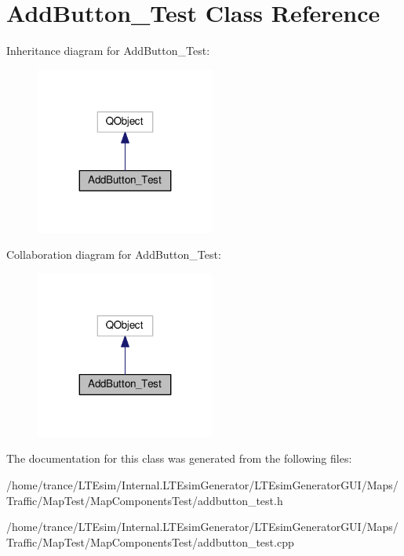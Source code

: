 \hypertarget{class_add_button___test}{}\section{Add\+Button\+\_\+\+Test Class Reference}
\label{class_add_button___test}


Inheritance diagram for Add\+Button\+\_\+\+Test\+:
\nopagebreak
\begin{figure}[H]
\begin{center}
\leavevmode
\includegraphics[width=167pt]{class_add_button___test__inherit__graph}
\end{center}
\end{figure}


Collaboration diagram for Add\+Button\+\_\+\+Test\+:
\nopagebreak
\begin{figure}[H]
\begin{center}
\leavevmode
\includegraphics[width=167pt]{class_add_button___test__coll__graph}
\end{center}
\end{figure}


The documentation for this class was generated from the following files\+:\begin{DoxyCompactItemize}
\item 
/home/trance/\+L\+T\+Esim/\+Internal.\+L\+T\+Esim\+Generator/\+L\+T\+Esim\+Generator\+G\+U\+I/\+Maps/\+Traffic/\+Map\+Test/\+Map\+Components\+Test/addbutton\+\_\+test.\+h\item 
/home/trance/\+L\+T\+Esim/\+Internal.\+L\+T\+Esim\+Generator/\+L\+T\+Esim\+Generator\+G\+U\+I/\+Maps/\+Traffic/\+Map\+Test/\+Map\+Components\+Test/addbutton\+\_\+test.\+cpp\end{DoxyCompactItemize}
